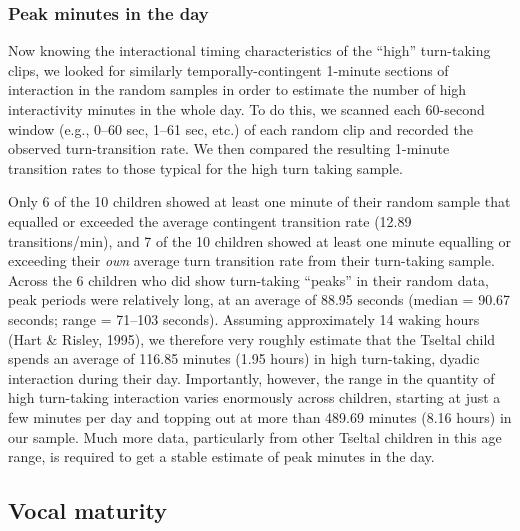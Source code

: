 \documentclass[floatsintext,man]{apa6}
\theoremstyle{definition}
\theoremstyle{definition}
\theoremstyle{definition}
\theoremstyle{remark}
\begin{document}
\subsubsection{Peak minutes in the day}\label{peak-minutes-in-the-day}

Now knowing the interactional timing characteristics of the
\enquote{high} turn-taking clips, we looked for similarly
temporally-contingent 1-minute sections of interaction in the random
samples in order to estimate the number of high interactivity minutes in
the whole day. To do this, we scanned each 60-second window (e.g., 0--60
sec, 1--61 sec, etc.) of each random clip and recorded the observed
turn-transition rate. We then compared the resulting 1-minute transition
rates to those typical for the high turn taking sample.

Only 6 of the 10 children showed at least one minute of their random
sample that equalled or exceeded the average contingent transition rate
(12.89 transitions/min), and 7 of the 10 children showed at least one
minute equalling or exceeding their \emph{own} average turn transition
rate from their turn-taking sample. Across the 6 children who did show
turn-taking \enquote{peaks} in their random data, peak periods were
relatively long, at an average of 88.95 seconds (median = 90.67 seconds;
range = 71--103 seconds). Assuming approximately 14 waking hours (Hart
\& Risley, 1995), we therefore very roughly estimate that the Tseltal
child spends an average of 116.85 minutes (1.95 hours) in high
turn-taking, dyadic interaction during their day. Importantly, however,
the range in the quantity of high turn-taking interaction varies
enormously across children, starting at just a few minutes per day and
topping out at more than 489.69 minutes (8.16 hours) in our sample. Much
more data, particularly from other Tseltal children in this age range,
is required to get a stable estimate of peak minutes in the day.

\subsection{Vocal maturity}\label{vocal-maturity}
\end{document}
